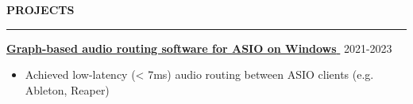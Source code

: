 \documentclass[notitlepage,10pt,a4paper]{article}
\newenvironment{resumesection}[1]{
    \header{#1}
}{}
\newcommand{\header}[1]{
    \vspace{2pt}
    \textcolor{accent1}{\Large \textbf{#1}}
    \vspace{6pt}\hrule\vspace{4pt}
}
\newcommand{\TECH}{
    \textcolor{accent3}{\small\textbf{SKILLS}}\small\,
}
\newcommand{\thingsep}{
    \vspace{4pt}
}
\newcommand{\LINK}[2]{
    \href{#1}{\textbf{#2}\,\,{\small\faExternalLink}}
}
\begin{document}
\begin{resumesection}{PROJECTS}
    \raggedright
    \textcolor{accent2}{\LINK{https://github.com/marisusis/route-suite}{\large Graph-based audio routing software for ASIO on Windows}} \hfill {2021-2023} \\
    {\small\begin{itemize}[noitemsep, font=\small, label={-}, leftmargin=*, topsep=0pt, partopsep=0pt]
        \item Achieved low-latency (< 7ms) audio routing between ASIO clients (e.g. Ableton, Reaper)
    \end{itemize}}
    \thingsep




\end{resumesection}
\end{document}
